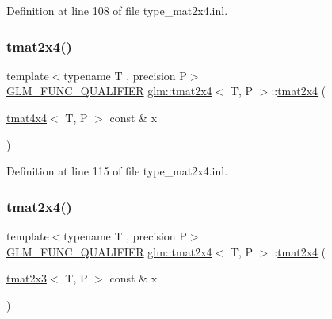 Definition at line 108 of file type\+\_\+mat2x4.\+inl.

\mbox{\label{structglm_1_1tmat2x4_ada474dee56734cd6ad136b0845e1f71e}} 
\subsubsection{\texorpdfstring{tmat2x4()}{tmat2x4()}\hspace{0.1cm}{\footnotesize\ttfamily [13/22]}}
{\footnotesize\ttfamily template$<$typename T , precision P$>$ \\
\mbox{\hyperlink{setup_8hpp_a33fdea6f91c5f834105f7415e2a64407}{G\+L\+M\+\_\+\+F\+U\+N\+C\+\_\+\+Q\+U\+A\+L\+I\+F\+I\+ER}} \mbox{\hyperlink{structglm_1_1tmat2x4}{glm\+::tmat2x4}}$<$ T, P $>$\+::\mbox{\hyperlink{structglm_1_1tmat2x4}{tmat2x4}} (\begin{DoxyParamCaption}\item[{\mbox{\hyperlink{structglm_1_1tmat4x4}{tmat4x4}}$<$ T, P $>$ const \&}]{x }\end{DoxyParamCaption})}



Definition at line 115 of file type\+\_\+mat2x4.\+inl.

\mbox{\label{structglm_1_1tmat2x4_ad992a0195fb70e4ec2345b8ce248a9a6}} 
\subsubsection{\texorpdfstring{tmat2x4()}{tmat2x4()}\hspace{0.1cm}{\footnotesize\ttfamily [14/22]}}
{\footnotesize\ttfamily template$<$typename T , precision P$>$ \\
\mbox{\hyperlink{setup_8hpp_a33fdea6f91c5f834105f7415e2a64407}{G\+L\+M\+\_\+\+F\+U\+N\+C\+\_\+\+Q\+U\+A\+L\+I\+F\+I\+ER}} \mbox{\hyperlink{structglm_1_1tmat2x4}{glm\+::tmat2x4}}$<$ T, P $>$\+::\mbox{\hyperlink{structglm_1_1tmat2x4}{tmat2x4}} (\begin{DoxyParamCaption}\item[{\mbox{\hyperlink{structglm_1_1tmat2x3}{tmat2x3}}$<$ T, P $>$ const \&}]{x }\end{DoxyParamCaption})}



